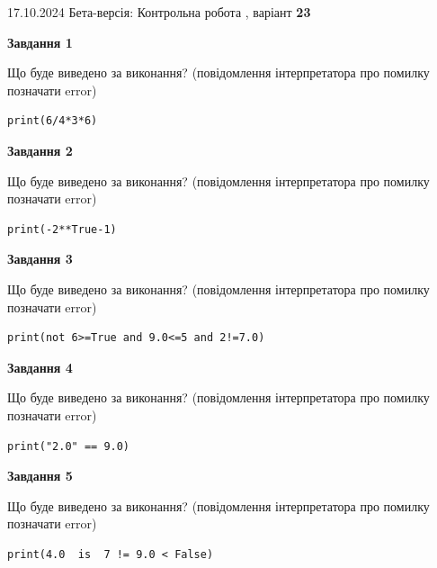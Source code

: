 \documentclass[12pt, ukrainian]{article}
\begin{document}
{\Large{17.10.2024 Бета-версія: Контрольна робота , варіант  \No \textbf { 23 }\par}}
{
\begin {large}
{\begin {center}\textbf{Завдання 1}\end {center}}

Що буде виведено за виконання? (повідомлення інтерпретатора про помилку позначати error)\par
\begin{verbatim}
print(6/4*3*6)
\end{verbatim}

{\begin {center}\textbf{Завдання 2}\end {center}}

Що буде виведено за виконання? (повідомлення інтерпретатора про помилку позначати error)\par
\begin{verbatim}
print(-2**True-1)
\end{verbatim}

{\begin {center}\textbf{Завдання 3}\end {center}}

Що буде виведено за виконання? (повідомлення інтерпретатора про помилку позначати error)\par
\begin{verbatim}
print(not 6>=True and 9.0<=5 and 2!=7.0)
\end{verbatim}

{\begin {center}\textbf{Завдання 4}\end {center}}

Що буде виведено за виконання? (повідомлення інтерпретатора про помилку позначати error)\par
\begin{verbatim}
print("2.0" == 9.0)
\end{verbatim}

{\begin {center}\textbf{Завдання 5}\end {center}}

Що буде виведено за виконання? (повідомлення інтерпретатора про помилку позначати error)\par
\begin{verbatim}
print(4.0  is  7 != 9.0 < False)
\end{verbatim}


\end{large}}
\end{document}
